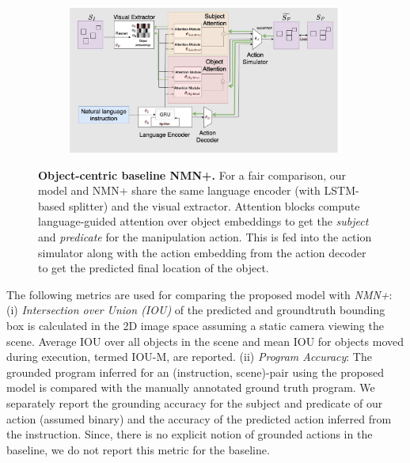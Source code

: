 \begin{figure}
\begin{subfigure}{1.0\hsize}
     \centering    
     \includegraphics[scale=0.19]{figures/baseline.png}
\end{subfigure}
\caption{
    \footnotesize{
        \textbf{Object-centric baseline NMN+.} For a fair comparison, our model and NMN+ share the same language encoder (with LSTM-based splitter) and the visual extractor. Attention blocks compute language-guided attention over object embeddings to get the \emph{subject} and \emph{predicate} for the manipulation action. This is fed into the action simulator along with the action embedding from the action decoder to get the predicted final location of the object.}}
        \vspace{-0.15in}
            \label{fig:nmn}
\end{figure}

The following metrics are used for comparing the proposed model with \emph{NMN+}:
(i) \emph{Intersection over Union (IOU)} of the predicted and groundtruth bounding box is calculated in the 2D image space assuming a static camera viewing the scene. Average IOU over all objects in the scene and mean IOU for objects moved during execution, termed IOU-M,  are reported.  
(ii) \emph{Program Accuracy}: The grounded program inferred for an (instruction, scene)-pair using the proposed model is compared with the manually annotated ground truth program. We separately report the grounding accuracy for the subject and predicate of our action (assumed binary) and the accuracy of the predicted action inferred from the instruction. Since, there is no explicit notion of grounded actions in the baseline, we do not report this metric for the baseline. 

